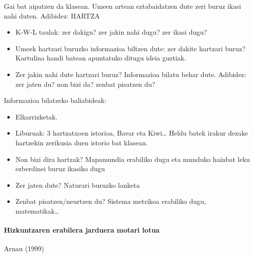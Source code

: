 \documentclass[
]{book}
\providecommand{\tightlist}{%
  \setlength{\itemsep}{0pt}\setlength{\parskip}{0pt}}
\begin{document}
Gai bat aipatzen da klasean. Umeen artean eztabaidatzen dute zeri buruz ikasi nahi duten. Adibidez: HARTZA

\begin{itemize}
\tightlist
\item
  K-W-L taulak: zer dakigu? zer jakin nahi dugu? zer ikasi dugu?
\item
  Umeek hartzari buruzko informazioa biltzen dute: zer dakite hartzari buruz?
  Kartulina handi batean apuntatuko ditugu ideia guztiak.
\item
  Zer jakin nahi dute hartzari buruz? Informazioa bilatu behar dute.
  Adibidez: zer jaten du? non bizi da? zenbat pisatzen du?
\end{itemize}

Informazioa bilatzeko baliabideak:

\begin{itemize}
\tightlist
\item
  Elkarrizketak.
\item
  Liburuak: 3 hartzatxoen istorioa, Bavar eta Kiwi\ldots{} Heldu batek irakur dezake hartzekin zerikusia duen istorio bat klasean.
\item
  Non bizi dira hartzak? Mapamundia erabiliko dugu eta munduko hainbat leku ezberdinei buruz ikasiko dugu
\item
  Zer jaten dute? Naturari buruzko lanketa
\item
  Zenbat pisatzen/neurtzen du? Sistema metrikoa erabiliko dugu, matematikak\ldots{}
\end{itemize}

\hypertarget{hizkuntzaren-erabilera-jarduera-motari-lotua}{%
\paragraph{Hizkuntzaren erabilera jarduera motari lotua}\label{hizkuntzaren-erabilera-jarduera-motari-lotua}}

Arnau (1999)
\end{document}
